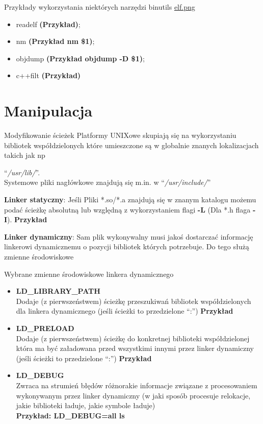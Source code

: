\begin{frame}{Przykłady wykorzystania niektórych narzędzi binutils}
  \url{elf.png} \cite{ELFPic}
  \begin{itemize}
  \item readelf \textbf{(Przykład)};
  \item nm \textbf{(Przykład nm \$1)};
	\item objdump \textbf{(Przykład objdump -D \$1)};
	\item c++filt \textbf{(Przykład)}
  \end{itemize}
\end{frame}
\section{Manipulacja}
\begin{frame}{Modyfikowanie ścieżek}
  Platformy UNIXowe skupiają się na wykorzystaniu bibliotek współdzielonych
  które umieszczone są w globalnie znanych lokalizacjach takich jak np


  ``\textit{/usr/lib/}''. \\Systemowe pliki nagłówkowe znajdują się m.in. w
  ``\textit{/usr/include/}'' \vspace{\baselineskip}

  \textbf{Linker statyczny}: Jeśli Pliki *.so/*.a znajdują się w znanym katalogu
  możemu podać ścieżkę absolutną lub względną z wykorzystaniem flagi \textbf{-L}
  (Dla *.h flaga \textbf{-I}). \textbf{Przykład}
	\vspace{\baselineskip}

  \textbf{Linker dynamiczny}: Sam plik wykonywalny musi jakoś dostarczać
  informację linkerowi dynamicznemu o pozycji bibliotek których potrzebuje. Do
  tego służą zmienne środowiskowe
\end{frame}
\begin{frame}{Wybrane zmienne środowiskowe linkera dynamicznego}
  \begin{itemize}
  \item \textbf{LD\_LIBRARY\_PATH}\\
    Dodaje (z pierwszeństwem) ścieżkę przeszukiwań bibliotek współdzielonych dla
    linkera dynamicznego (jeśli ścieżki to przedzielone ``:'') \textbf{Przykład}
  \item \textbf{LD\_PRELOAD}\\
    Dodaje (z pierwszeństwem) ścieżkę do konkretnej biblioteki współdzielonej
    która ma być załadowana przed wszystkimi innymi przez linker dynamiczny
    (jeśli ścieżki to przedzielone ``:'') \textbf{Przykład}
  \item \textbf{LD\_DEBUG}\\
    Zwraca na strumień błędów różnorakie informacje związane z procesowaniem
    wykonywanym przez linker dynamiczny (w jaki sposób procesuje relokacje,
    jakie biblioteki ładuje, jakie symbole ładuje)\\
    \textbf{Przykład: LD\_DEBUG=all ls}
  \end{itemize}
\end{frame}
